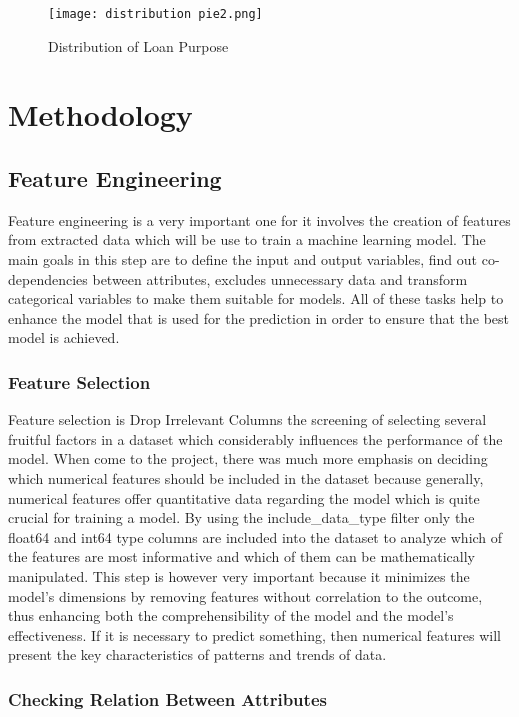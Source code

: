 \documentclass[12pt, a4paper,oneside]{book}
\numberwithin{equation}{section}
\begin{document}
\begin{figure}[ht]
    \centering
    \texttt{[image: distribution pie2.png]}  
    \caption{Distribution of Loan Purpose}
    \label{fig:subsubsection}
\end{figure}
\FloatBarrier

\chapter{Methodology}
\section{Feature Engineering}

Feature engineering is a very important one for it involves the creation of features from extracted data which will be use to train a machine learning model. The main goals in this step are to define the input and output variables, find out co-dependencies between attributes, excludes unnecessary data and transform categorical variables to make them suitable for models. All of these tasks help to enhance the model that is used for the prediction in order to ensure that the best model is achieved. 

\subsection{ Feature Selection}

Feature selection is Drop Irrelevant Columns the screening of selecting several fruitful factors in a dataset which considerably influences the performance of the model. When come to the project, there was much more emphasis on deciding which numerical features should be included in the dataset because generally, numerical features offer quantitative data regarding the model which is quite crucial for training a model. By using the include\_data\_type filter only the float64 and int64 type columns are included into the dataset to analyze which of the features are most informative and which of them can be mathematically manipulated. This step is however very important because it minimizes the model’s dimensions by removing features without correlation to the outcome, thus enhancing both the comprehensibility of the model and the model’s effectiveness. If it is necessary to predict something, then numerical features will present the key characteristics of patterns and trends of data. 

\subsection{Checking Relation Between Attributes}
\end{document}

